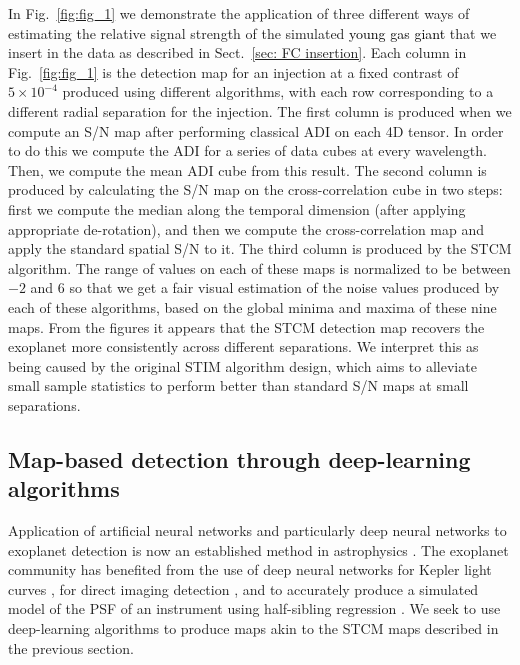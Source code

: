 \documentclass{aa}
\newcommand{\newchange}[1]{\textcolor{black}{#1}}
\begin{document}
In Fig.~\ref{fig:fig_1} we demonstrate the application of three different ways of estimating the relative signal strength of the simulated \newchange{young gas giant} that we insert in the data as described in Sect.~\ref{sec: FC insertion}.
Each column in Fig.~\ref{fig:fig_1} is the detection map for an injection at a fixed contrast of $5\times 10^{-4}$ produced using different algorithms, with each row corresponding to a different radial separation for the injection. %
The first column is produced when we compute an S/N map \citep[as defined in][]{2014Mawet} after performing classical ADI on each 4D tensor.
In order to do this we compute the ADI for a series of data cubes at every wavelength. Then, we compute the mean ADI cube from this result. 
The second column is produced by calculating the S/N map \citep[as defined in][]{2014Mawet} on the cross-correlation cube in two steps: first we compute the median along the temporal dimension (after applying appropriate de-rotation), and then we compute the cross-correlation map and apply the standard spatial S/N to it.
The third column is produced by the STCM algorithm.
The range of values on each of these maps is normalized to be between $-2$ and $6$ so that we get a fair visual estimation of the noise values produced by each of these algorithms, based on the global minima and maxima of these nine maps.
From the figures it appears that the STCM detection map recovers the exoplanet more consistently across different separations. We interpret this as being caused by the original STIM algorithm design, which aims to alleviate small sample statistics to perform better than standard S/N maps at small separations.

\subsection{Map-based detection through deep-learning algorithms}\label{sec:ML algorithms}

Application of artificial neural networks and particularly deep neural networks to exoplanet detection is now an established method in astrophysics \citep[][]{2020Fluke}.
The exoplanet community has benefited from the use of deep neural networks for Kepler light curves \citep{2018Pearson}, for direct imaging detection \citep{2018Gomez}, and to accurately produce a simulated model of the PSF of an instrument using half-sibling regression \citep{2022Gebhard}.
We seek to use deep-learning algorithms to produce maps akin to the STCM maps described in the previous section.
\end{document}
